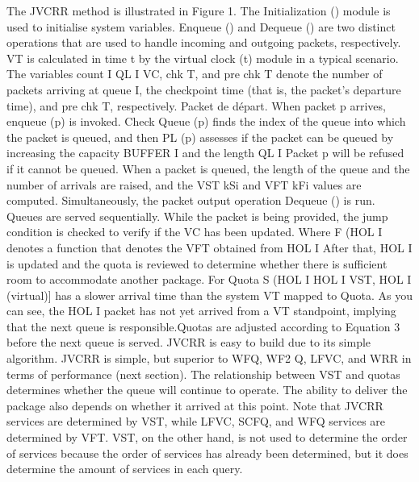 The JVCRR method is illustrated in Figure 1. The Initialization () module is used to initialise system variables. Enqueue () and Dequeue () are two distinct operations that are used to handle incoming and outgoing packets, respectively. VT is calculated in time t by the virtual clock (t) module in a typical scenario. The variables count I QL I VC, chk T, and pre chk T denote the number of packets arriving at queue I, the checkpoint time (that is, the packet's departure time), and pre chk T, respectively. Packet de d\'epart. When packet p arrives, enqueue (p) is invoked. Check Queue (p) finds the index of the queue into which the packet is queued, and then PL (p) assesses if the packet can be queued by increasing the capacity BUFFER I and the length QL I Packet p will be refused if it cannot be queued. When a packet is queued, the length of the queue and the number of arrivals are raised, and the VST kSi and VFT kFi values are computed. Simultaneously, the packet output operation Dequeue () is run. Queues are served sequentially. While the packet is being provided, the jump condition is checked to verify if the VC has been updated. Where F (HOL I denotes a function that denotes the VFT obtained from HOL I After that, HOL I is updated and the quota is reviewed to determine whether there is sufficient room to accommodate another package. For Quota S (HOL I HOL I VST, HOL I (virtual)] has a slower arrival time than the system VT mapped to Quota. As you can see, the HOL I packet has not yet arrived from a VT standpoint, implying that the next queue is responsible.Quotas are adjusted according to Equation 3 before the next queue is served. JVCRR is easy to build due to its simple algorithm. JVCRR is simple, but superior to WFQ, WF2 Q, LFVC, and WRR in terms of performance (next section). The relationship between VST and quotas determines whether the queue will continue to operate. The ability to deliver the package also depends on whether it arrived at this point. Note that JVCRR services are determined by VST, while LFVC, SCFQ, and WFQ services are determined by VFT. VST, on the other hand, is not used to determine the order of services because the order of services has already been determined, but it does determine the amount of services in each query.

